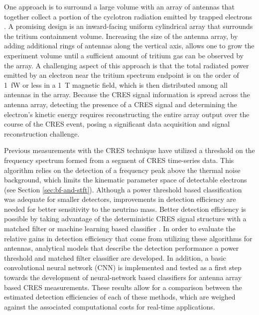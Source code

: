 One approach is to surround a large volume with an array of antennas that together collect a portion of the cyclotron radiation emitted by trapped electrons \cite{p8snowmass2022, p8PanicProc}. A promising design is an inward-facing uniform cylindrical array that surrounds the tritium containment volume. Increasing the size of the antenna array, by adding additional rings of antennas along the vertical axis, allows one to grow the experiment volume until a sufficient amount of tritium gas can be observed by the array. A challenging aspect of this approach is that the total radiated power emitted by an electron near the tritium spectrum endpoint is on the order of 1~fW or less in a 1~T magnetic field, which is then distributed among all antennas in the array. Because the CRES signal information is spread across the antenna array, detecting the presence of a CRES signal and determining the electron's kinetic energy requires reconstructing the entire array output over the course of the CRES event, posing a significant data acquisition and signal reconstruction challenge.%

Previous measurements with the CRES technique have utilized a threshold on the frequency spectrum formed from a segment of CRES time-series data. This algorithm relies on the detection of a frequency peak above the thermal noise background, which limits the kinematic parameter space of detectable electrons (see Section \ref{sec:bf-and-stft}). Although a power threshold based classification was adequate for smaller detectors, improvements in detection efficiency are needed for better sensitivity to the neutrino mass. Better detection efficiency is possible by taking advantage of the deterministic CRES signal structure with a matched filter or machine learning based classifier \cite{p8ml_1}. In order to evaluate the relative gains in detection efficiency that come from utilizing these algorithms for antennas, analytical models that describe the detection performance a power threshold and matched filter classifier are developed. In addition, a basic convolutional neural network (CNN) is implemented and tested as a first step towards the development of neural-network based classifiers for antenna array based CRES measurements. These results allow for a comparison between the estimated detection efficiencies of each of these methods, which are weighed against the associated computational costs for real-time applications.

